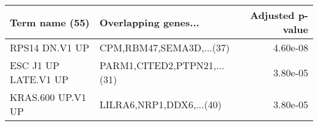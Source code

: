 \begin{tabular}{llr}
\toprule
      Term name (55) &        Overlapping genes... &  Adjusted p-value \\
\midrule
      RPS14 DN.V1 UP &    CPM,RBM47,SEMA3D,...(37) &          4.60e-08 \\
ESC J1 UP LATE.V1 UP & PARM1,CITED2,PTPN21,...(31) &          3.80e-05 \\
   KRAS.600 UP.V1 UP &    LILRA6,NRP1,DDX6,...(40) &          3.80e-05 \\
\bottomrule
\end{tabular}

